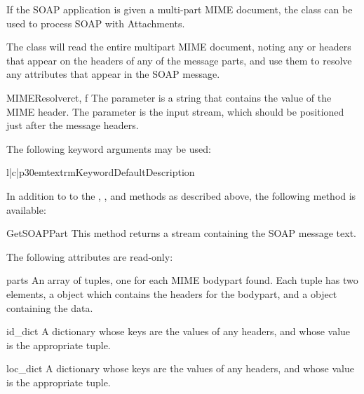 If the SOAP application is given a multi-part MIME document, the
 class can be used to process SOAP with Attachments.

The  class will read the entire multipart MIME document,
noting any  or  headers that appear
on the headers of any of the message parts, and use them to resolve
any  attributes that appear in the SOAP message.

\begin{classdesc}{MIMEResolver}{ct, f}
The  parameter is a string that contains the value of the
MIME  header.
The  parameter is the input stream, which should be positioned just
after the message headers.

The following keyword arguments may be used:

\begin{tableiii}{l|c|p{30em}}{textrm}{Keyword}{Default}{Description}
\end{tableiii}
\end{classdesc}

In addition to to the , , and  methods
as described above, the following method is available:

\begin{methoddesc}{GetSOAPPart}{}
This method returns a stream containing the SOAP message text.
\end{methoddesc}

The following attributes are read-only:

\begin{memberdesc}{parts}
An array of tuples, one for each MIME bodypart found.
Each tuple has two elements, a  object
which contains the headers for the bodypart, and a 
 object containing the data.
\end{memberdesc}

\begin{memberdesc}{id_dict}
A dictionary whose keys are the values of any 
headers, and whose value is the appropriate  tuple.
\end{memberdesc}

\begin{memberdesc}{loc_dict}
A dictionary whose keys are the values of any 
headers, and whose value is the appropriate  tuple.
\end{memberdesc}

